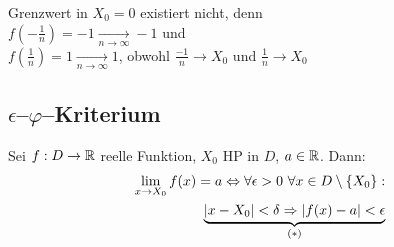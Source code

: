 \documentclass[10pt, a4paper, fleqn]{article}
\begin{document}
\begin{enumerate}[a)]
    Grenzwert in $X_0 = 0$ existiert nicht, denn \\
    $f(-\frac{1}{n}) = -1 \xrightarrow[n \to \infty]{} -1$ und \\
    $f(\frac{1}{n}) = 1 \xrightarrow[n \to \infty]{} 1$, obwohl 
    $\frac{-1}{n} \to X_0$ und $\frac{1}{n} \to X_0$
    \end{enumerate}

    \subsection{$\epsilon$--$\varphi$--Kriterium}
    Sei $f: D \to \mathbb{R}$ reelle Funktion, $X_0$ HP in $D$,
    $a \in \mathbb{R}$. Dann:
    \[\begin{aligned}
        \lim_{x \to X_0} f(x) = a \Leftrightarrow \forall \epsilon > 0 \ \forall x \in D \setminus \{X_0\}: \\
        \underbrace{|x-X_0| < \delta \Rightarrow |f(x) - a| < \epsilon}_{(*)}
    \end{aligned}\]

\iffalse %
    \textbf{Anschaulich:}

    \begin{tikzpicture}[
        declare function = {f(\x) = \x^2;}
    ]
        \begin{axis}[
            width = 0.5\textwidth,
            xlabel = {$x$},
            xmin = 0, ymin = 0,
            xmax = 1.2, ymax = 1.2,
            axis x line = center,
            axis y line = center,
            axis line style = {->},
            xtick = {0.2, 0.55, 0.725, 0.9},
            xticklabels = {$X_0 - \delta$, $X_0$, $x$, $X_0 + \delta$},
            ytick = {0.04, 0.3025, 0.525625, 0.81},
            yticklabels = {$a - \epsilon$, $a$, $f(x)$, $a + \epsilon$},
            domain = 0:1.2
        ]
        \addplot[color = black] {f(x)};
        \legend{$x^2$}
        \end{axis}

    \end{tikzpicture}
\fi
\ifdefined\MAINDOC\else
\end{document}
